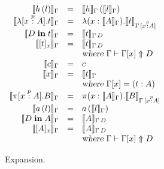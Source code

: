 \begin{figure}
\begin{center}
\begin{math}
\begin{array}{rclr}

\llbracket h\,(l) \rrbracket_{\Gamma}
&=& 
\llbracket h \rrbracket_{\Gamma}\,(\llbracket l \rrbracket_{\Gamma}) 
\\
\llbracket \lambda [x \stackrel{p}{:} A]. t \rrbracket_{\Gamma}
&=&
\lambda (x : \llbracket A \rrbracket_{\Gamma}). \llbracket t \rrbracket_{\Gamma \, [x \stackrel{p}{:} A]}
\\
\llbracket D \;\textbf{in}\; t \rrbracket_{\Gamma}
&=&
\llbracket t \rrbracket_{\Gamma \, D}
\\
\llbracket [ t ]_{x} \rrbracket_{\Gamma}
&=&
\llbracket t \rrbracket_{\Gamma \, D} \\
&&\textsl{where } \Gamma \vdash \Gamma[x] \Uparrow D
\\
\llbracket c \rrbracket_{\Gamma} 
&=&
c
\\
\llbracket x \rrbracket_{\Gamma} 
&=&
\llbracket t \rrbracket_{\Gamma} \\
&& \textsl{where } \Gamma[x] = (t : A)
\\
\llbracket \pi [x \stackrel{p}{:} A]. B \rrbracket_{\Gamma}
&=&
\pi (x : \llbracket A \rrbracket_{\Gamma}). \llbracket B \rrbracket_{\Gamma \, [x \stackrel{p}{:} A]}
\\
\llbracket a\,(l) \rrbracket_{\Gamma}
&=&
a\,(\llbracket l \rrbracket_{\Gamma}) 
\\
\llbracket D \;\textbf{in}\; A \rrbracket_{\Gamma}
&=&
\llbracket A \rrbracket_{\Gamma \, D}
\\
\llbracket [ A ]_{x} \rrbracket_{\Gamma}
&=&
\llbracket A \rrbracket_{\Gamma \, D}\\
&&\textsl{where } \Gamma \vdash \Gamma[x] \Uparrow D
\\
\end{array}
\end{math}
\end{center}
\caption{Expansion.}
\label{fig:expansion}
\end{figure}
